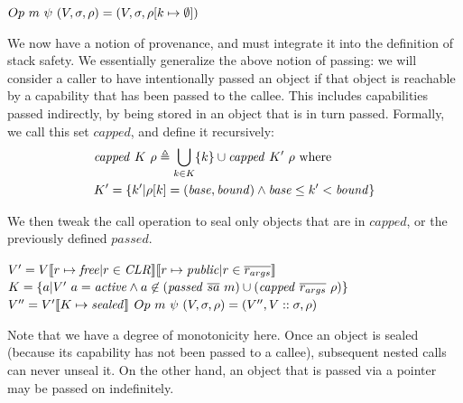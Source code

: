 \documentclass[10pt,conference]{ieeetran}%
\theoremstyle{definition}
\begin{document}
         {\(Op ~ m ~ \psi ~ (V,\sigma,\rho) = (V,\sigma,\rho[k \mapsto \emptyset])\)}

We now have a notion of provenance, and must integrate it into the definition of
stack safety. We essentially generalize the above notion of passing: we will consider
a caller to have intentionally passed an object if that object is reachable by
a capability that has been passed to the callee. This includes capabilities passed
indirectly, by being stored in an object that is in turn passed. Formally, we call
this set \(\mathit{capped}\), and define it recursively:
%
\[\begin{split}
& \mathit{capped} ~ K ~ \rho \triangleq \bigcup_{k \in K} \{k\} \cup \mathit{capped} ~ K' ~ \rho \textnormal{ where} \\
& K' = \{k' |\rho[k] = (\mathit{base},\mathit{bound})
\land \mathit{base} \leq k' < \mathit{bound}\} \\
\end{split}\]

We then tweak the call operation to seal only objects that are in \(\mathit{capped}\), or
the previously defined \(\mathit{passed}\).

               {\(V' = V \llbracket r \mapsto \mathit{free} | r \in \mathit{CLR} \rrbracket
                 \llbracket r \mapsto \mathit{public} | r \in \overline{r_{args}} \rrbracket\)}
               {\(K = \{a | V' ~ a = \mathit{active} \land a \not \in (\mathit{passed} ~ \overline{sa} ~ m) \cup (\mathit{capped} ~ \overline{r_{args}} ~ \rho) \}\)}
               {\(V'' = V'\llbracket K \mapsto \mathit{sealed} \rrbracket\)}
               {\(Op ~ m ~ \psi ~ (V,\sigma,\rho) =
                 (V'',V::\sigma,\rho)\)}

Note that we have a degree of monotonicity here. Once an object is sealed (because its
capability has not been passed to a callee), subsequent nested calls can never unseal it.
On the other hand, an object that is passed via a pointer may be passed on indefinitely.
\end{document}
